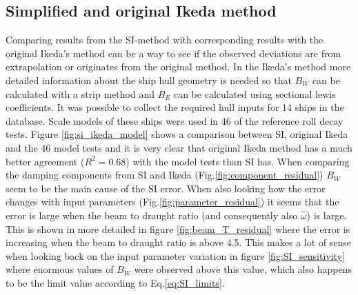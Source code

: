 \subsection{Simplified and original Ikeda method}
\label{se:si_ikeda_model}
Comparing results from the SI-method with corresponding results with the original Ikeda's method can be a way to see if the observed deviations are from extrapolation or originates from the original method. In the Ikeda's method more detailed information about the ship hull geometry is needed so that $B_W$ can be calculated with a strip method and $B_E$ can be calculated using sectional lewis coefficients. It was possible to collect the required hull inputs for 14 ships in the database. Scale models of these ships were used in 46 of the reference roll decay tests.
Figure \ref{fig:si_ikeda_model} shows a comparison between SI, original Ikeda and the 46 model tests and it is very clear that original Ikeda method has a much better agreement ($R^2=0.68$) with the model tests than SI has. When comparing the damping components from SI and Ikeda (Fig.\ref{fig:component_residual}) $B_W$ seem to be the main cause of the SI error. When also looking how the error changes with input parameters (Fig.\ref{fig:parameter_residual}) it seems that the error is large when the beam to draught ratio (and consequently also $\hat{\omega}$) is large. This is shown in more detailed in figure \ref{fig:beam_T_residual} where the error is increasing when the beam to draught ratio is above 4.5. This makes a lot of sense when looking back on the input parameter variation in figure \ref{fig:SI_sensitivity} where enormous values of $B_W$ were observed above this value, which also happens to be the limit value according to Eq.\ref{eq:SI_limits}.


